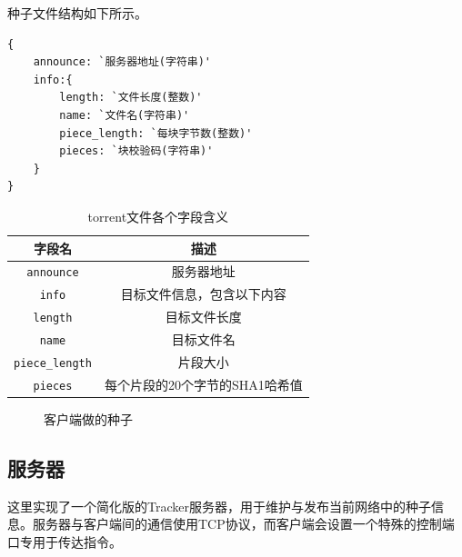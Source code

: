 \documentclass[thesis]{thesis}
\begin{document}
	种子文件结构如下所示。
\begin{lstlisting}
{
    announce: `服务器地址(字符串)'
    info:{
        length: `文件长度(整数)'
        name: `文件名(字符串)'
        piece_length: `每块字节数(整数)'
        pieces: `块校验码(字符串)'
    }
}
\end{lstlisting}
	\begin{table}[htbp]
		\caption{torrent文件各个字段含义}
		\label{tab:btfile}
		\centering
		\begin{tabular}{|c|c|}\hline
			\textbf{字段名} & \textbf{描述}\\\hline
			\verb'announce' & 服务器地址\\\hline
			\verb'info' & 目标文件信息，包含以下内容 \\\hline
			\verb'length' & 目标文件长度\\\hline
			\verb'name' & 目标文件名\\\hline
			\verb'piece_length' & 片段大小 \\\hline
			\verb'pieces' & 每个片段的20个字节的SHA1哈希值 \\\hline
		\end{tabular}
	\end{table}
	\begin{figure}[htbp]
		\centering
		\caption{客户端做的种子}
		\label{fig:torrentfile}
	\end{figure}

	\subsection{服务器}
	\label{sub:server}
	这里实现了一个简化版的Tracker服务器，用于维护与发布当前网络中的种子信息。服务器与客户端间的通信使用TCP协议，而客户端会设置一个特殊的控制端口专用于传达指令。
	
\end{document}
